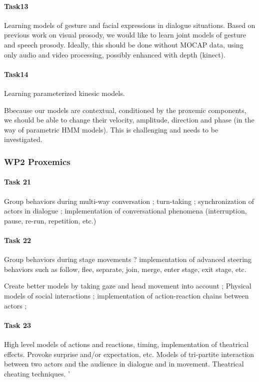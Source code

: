 \paragraph{Task13} Learning models of gesture and facial expressions in dialogue situations.
Based on previous work on  visual prosody, we would like to learn joint models of gesture and  speech prosody. Ideally, this should be done without MOCAP data, using only audio and video processing, possibly enhanced with depth (kinect).

\paragraph{Task14}  Learning parameterized kinesic models. 

Bbecause our models are contextual, conditioned by the proxemic components, we should be able to change their velocity,  amplitude, direction and phase (in the way of parametric HMM models). This is challenging and needs to be investigated. 


\subsubsection{WP2 Proxemics}

\paragraph{Task 21} Group behaviors during multi-way conversation ; turn-taking ; synchronization of actors in dialogue ; implementation of conversational phenomena (interruption, pause, re-run, repetition, etc.)

\paragraph{Task 22} Group behaviors during stage movements ? implementation of advanced steering behaviors  such as follow, flee, separate, join, merge, enter stage, exit stage, etc. 

Create better models by taking gaze and head movement into account ; Physical models of social interactions ; implementation of action-reaction chains between actors ; 

\paragraph{Task 23} High level models of actions and reactions, timing, implementation of theatrical effects. Provoke surprise and/or expectation, etc. Models of tri-partite interaction between two actors and the audience in dialogue and in movement. Theatrical cheating techniques. '

